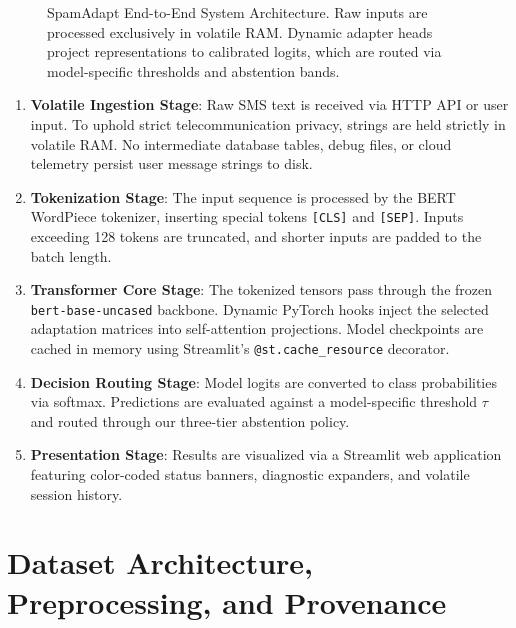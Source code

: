 \documentclass[conference]{IEEEtran}
\begin{document}
\begin{figure}[t]
\caption{SpamAdapt End-to-End System Architecture. Raw inputs are processed exclusively in volatile RAM. Dynamic adapter heads project representations to calibrated logits, which are routed via model-specific thresholds and abstention bands.}
\label{fig:architecture}
\end{figure}

\begin{enumerate}
    \item \textbf{Volatile Ingestion Stage}: Raw SMS text is received via HTTP API or user input. To uphold strict telecommunication privacy, strings are held strictly in volatile RAM. No intermediate database tables, debug files, or cloud telemetry persist user message strings to disk.
    \item \textbf{Tokenization Stage}: The input sequence is processed by the BERT WordPiece tokenizer, inserting special tokens \texttt{[CLS]} and \texttt{[SEP]}. Inputs exceeding 128 tokens are truncated, and shorter inputs are padded to the batch length.
    \item \textbf{Transformer Core Stage}: The tokenized tensors pass through the frozen \texttt{bert-base-uncased} backbone. Dynamic PyTorch hooks inject the selected adaptation matrices into self-attention projections. Model checkpoints are cached in memory using Streamlit's \texttt{@st.cache\_resource} decorator.
    \item \textbf{Decision Routing Stage}: Model logits are converted to class probabilities via softmax. Predictions are evaluated against a model-specific threshold $\tau$ and routed through our three-tier abstention policy.
    \item \textbf{Presentation Stage}: Results are visualized via a Streamlit web application featuring color-coded status banners, diagnostic expanders, and volatile session history.
\end{enumerate}

\section{Dataset Architecture, Preprocessing, and Provenance}
\label{sec:dataset}
\end{document}
